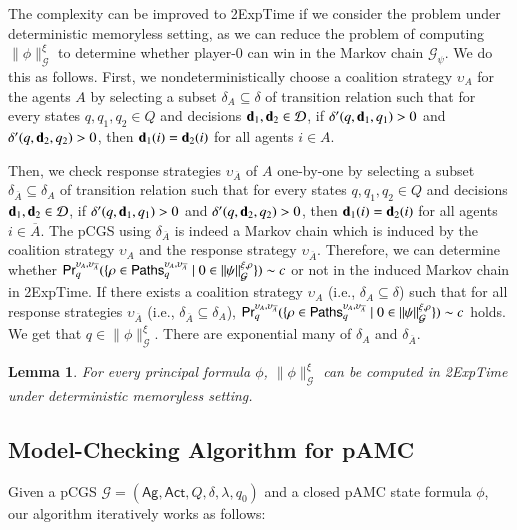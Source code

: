 \documentclass[letterpaper]{article}
\newcommand{\calM}{\mathcal{G}}
\newcommand{\calD}{\mathcal{D}}
\newcommand{\calP}{{\sf Paths}}
\newcommand{\Ag}{\textsf{Ag}}
\newcommand{\Act}{\textsf{Act}}
\newcommand{\Prb}{\textsf{Pr}}
\newcommand{\nA}{\overline{A}}
\newcommand{\dec}{{\bf d}}
\newcommand{\pamc}{{pAMC}\xspace}
\newcommand {\semantics}[1]{\|{#1}\|}  %
\newtheorem{lemma}{Lemma}
\begin{document}
The complexity can be improved to {\sc 2ExpTime} if we consider the problem under deterministic memoryless setting, as we can reduce the problem of computing $\semantics{\phi}_\calM^\xi$
to determine whether player-0 can win in the Markov chain $\calM_\psi$. We do this as follows. First, we nondeterministically choose a coalition strategy $\upsilon_A$ for the agents $A$ by selecting a subset $\delta_A\subseteq \delta$ of transition relation such that for every states $q,q_1,q_2\in Q$ and decisions $\dec_1,\dec_2\in\calD$,
if $\delta'(q,\dec_1,q_1)>0$ and $\delta'(q,\dec_2,q_2)>0$, then $\dec_1(i)=\dec_2(i)$ for all agents $i\in A$.

Then, we check response strategies $\upsilon_{\nA}$ of $A$ one-by-one by selecting a subset $\delta_{\nA}\subseteq \delta_A$ of transition relation such that for every states $q,q_1,q_2\in Q$ and decisions $\dec_1,\dec_2\in\calD$, if $\delta'(q,\dec_1,q_1)>0$ and $\delta'(q,\dec_2,q_2)>0$, then $\dec_1(i)=\dec_2(i)$ for all agents $i\in \nA$.
The pCGS using $\delta_{\nA}$ is indeed a Markov chain which is induced by the coalition strategy $\upsilon_A$ and the response strategy $\upsilon_{\nA}$.
Therefore, we can determine whether $\Prb_q^{\upsilon_A,\upsilon_{\nA}}(\{\rho\in \calP_q^{\upsilon_A,\upsilon_{\nA}}\mid 0\in  \semantics{\psi}_\calM^{\xi,\rho}\})\sim c$ or not  in the induced Markov chain in {\sc 2ExpTime}.
If there exists a coalition strategy $\upsilon_A$ (i.e., $\delta_A\subseteq \delta$) such that for all response strategies $\upsilon_{\nA}$ (i.e., $\delta_{\nA}\subseteq \delta_A$),
$\Prb_q^{\upsilon_A,\upsilon_{\nA}}(\{\rho\in \calP_q^{\upsilon_A,\upsilon_{\nA}}\mid 0\in  \semantics{\psi}_\calM^{\xi,\rho}\})\sim c$ holds. We get that
$q\in \semantics{\phi}_\calM^\xi$. There are exponential many of $\delta_A$ and $\delta_{\nA}$.

\begin{lemma}
\label{lemma-mcpfdm}
For every principal formula $\phi$,
$\semantics{\phi}_\calM^\xi$ can be computed in {\sc 2ExpTime} under deterministic memoryless setting.
\end{lemma}


\subsection{Model-Checking Algorithm for \pamc}
Given a pCGS $\calM=(\Ag,\Act, Q, \delta,\lambda,q_0)$ and a closed \pamc state formula $\phi$, our algorithm iteratively works as follows:
\end{document}

